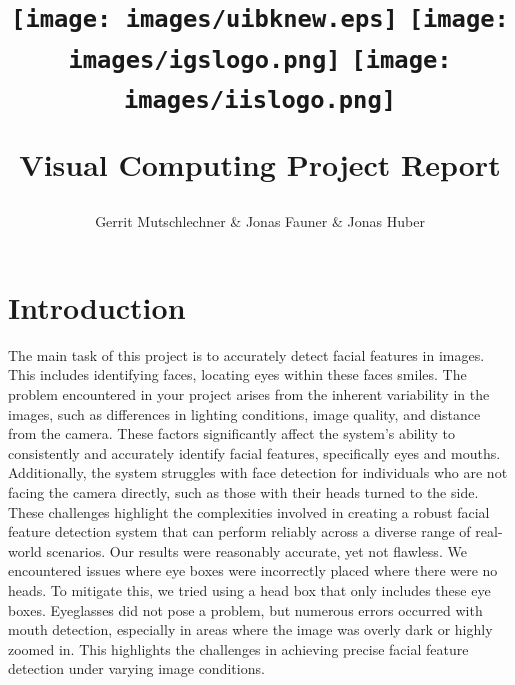 \documentclass[11pt, a4paper, twocolumn]{article}
\title{
\begin{flushleft}
\texttt{[image: images/uibknew.eps]}
\hfill
\texttt{[image: images/igslogo.png]}
\hspace{0.3cm}
\texttt{[image: images/iislogo.png]}
\end{flushleft}\vspace{0.5cm}
Visual Computing Project Report}
\author{Gerrit Mutschlechner \& Jonas Fauner \& Jonas Huber}
\begin{document}
\maketitle

\thispagestyle{empty}


\section*{Introduction}

The main task of this project is to accurately detect facial features in images. This includes identifying faces, locating eyes within these faces smiles.
The problem encountered in your project arises from the inherent variability in the images, such as differences in lighting conditions, image quality, and distance from the camera. These factors significantly affect the system's ability to consistently and accurately identify facial features, specifically eyes and mouths. Additionally, the system struggles with face detection for individuals who are not facing the camera directly, such as those with their heads turned to the side. These challenges highlight the complexities involved in creating a robust facial feature detection system that can perform reliably across a diverse range of real-world scenarios. \cite{GreatLearning2023}
Our results were reasonably accurate, yet not flawless. We encountered issues where eye boxes were incorrectly placed where there were no heads. To mitigate this, we tried using a head box that only includes these eye boxes. Eyeglasses did not pose a problem, but numerous errors occurred with mouth detection, especially in areas where the image was overly dark or highly zoomed in. This highlights the challenges in achieving precise facial feature detection under varying image conditions.
\end{document}
